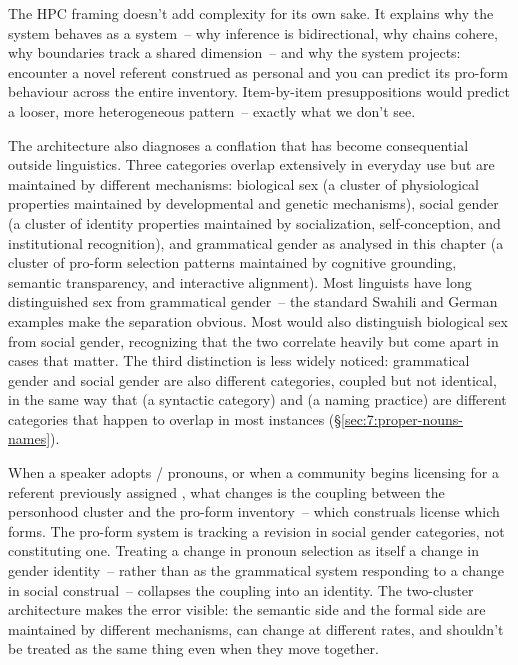 The HPC framing doesn't add complexity for its own sake. It explains why the system behaves as a system~-- why inference is bidirectional, why chains cohere, why boundaries track a shared dimension~-- and why the system projects: encounter a novel referent construed as personal and you can predict its pro-form behaviour across the entire inventory. Item-by-item presuppositions would predict a looser, more heterogeneous pattern~-- exactly what we don't see.

The architecture also diagnoses a conflation that has become consequential outside linguistics. Three categories overlap extensively in everyday use but are maintained by different mechanisms: biological sex (a cluster of physiological properties maintained by developmental and genetic mechanisms), social gender (a cluster of identity properties maintained by socialization, self-conception, and institutional recognition), and grammatical gender as analysed in this chapter (a cluster of pro-form selection patterns maintained by cognitive grounding, semantic transparency, and interactive alignment). Most linguists have long distinguished sex from grammatical gender~-- the standard Swahili and German examples make the separation obvious. Most would also distinguish biological sex from social gender, recognizing that the two correlate heavily but come apart in cases that matter. The third distinction is less widely noticed: grammatical gender and social gender are also different categories, coupled but not identical, in the same way that  (a syntactic category) and  (a naming practice) are different categories that happen to overlap in most instances (§\ref{sec:7:proper-nouns-names}).

When a speaker adopts / pronouns, or when a community begins licensing  for a referent previously assigned , what changes is the coupling between the personhood cluster and the pro-form inventory~-- which construals license which forms. The pro-form system is tracking a revision in social gender categories, not constituting one. Treating a change in pronoun selection as itself a change in gender identity~-- rather than as the grammatical system responding to a change in social construal~-- collapses the coupling into an identity. The two-cluster architecture makes the error visible: the semantic side and the formal side are maintained by different mechanisms, can change at different rates, and shouldn't be treated as the same thing even when they move together.

